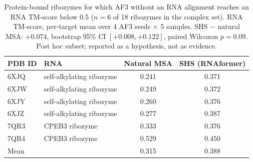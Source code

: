 \begin{table}[t]
\centering
\caption{Protein-bound ribozymes for which AF3 without an RNA alignment reaches an RNA TM-score below 0.5 ($n{=}6$ of 18 ribozymes in the complex set). RNA TM-score, per-target mean over 4 AF3 seeds $\times$ 5 samples. SHS $-$ natural MSA: $+0.074$, bootstrap 95\% CI $[+0.008, +0.122]$, paired Wilcoxon $p{=}0.09$. Post hoc subset; reported as a hypothesis, not as evidence.}
\label{tab:ribozymes}
\begin{tabular}{llcc}
\toprule
PDB ID & RNA & Natural MSA & SHS (RNAformer) \\
\midrule
6XJQ & self-alkylating ribozyme & 0.241 & 0.371 \\
6XJW & self-alkylating ribozyme & 0.249 & 0.372 \\
6XJY & self-alkylating ribozyme & 0.260 & 0.376 \\
6XJZ & self-alkylating ribozyme & 0.277 & 0.387 \\
7QR3 & CPEB3 ribozyme & 0.333 & 0.376 \\
7QR4 & CPEB3 ribozyme & 0.529 & 0.450 \\
\midrule
Mean & & 0.315 & 0.388 \\
\bottomrule
\end{tabular}
\end{table}
